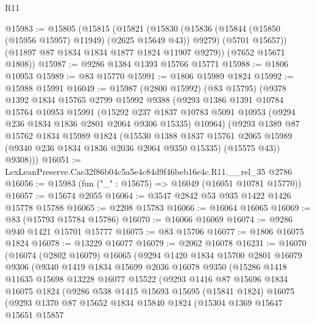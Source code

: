 \begin{lexlean}{R11}
\begin{coremodule}
@15983 := @15805
    (@15815
      (@15821
        (@15830
          (@15836 (@15844 (@15850 (@15956 @15957) @11949) (@2625 @15649 @43)) @9279)
          (@5701 @15657))
        (@11897 @87 @1834 @1834 @1877 @1824 @11907 @9279))
      (@7652 @15671 @1808))
@15987 := @9286 @1384 @1393 @15766 @15771
@15988 := @1806 @10953
@15989 := @83 @15770
@15991 := @1806 @15989 @1824
@15992 := @15988 @15991
@16049 := @15987
    (@2800 @15992)
    (@83 @15795)
    (@9378
      @1392
      @1834
      @15765
      @2799
      @15992
      @9388
      (@9293
        @1386
        @1391
        @10784
        @15764
        @10953
        @15991
        (@15292
          @237
          @1837
          @10783
          @5091
          @10953
          (@9294 @236 @1834 @1836 @2801 @2064 @9306 @15335)
          @10964)
        (@9293
          @1389
          @87
          @15762
          @1834
          @15989
          @1824
          (@15530
            @1388
            @1837
            @15761
            @2065
            @15989
            (@9340 @236 @1834 @1836 @2036 @2064 @9350 @15335)
            (@15575 @43))
          @9308)))
@16051 := LexLeanPreserve.Cac32f86b04c5a5e4c84d9f46beb16e4c.R11.__rel_35 @2786
@16056 := @15983 (fun ("_" : @15675) => @16049 (@16051 @10781 @15770))
@16057 := @15674 @2055
@16064 := @3547 @2842 @53 @935 @1422 @1426 @15778 @15788
@16065 := @2208 @15783
@16066 := @16064 @16065
@16069 := @83 (@15793 @15784 @15786)
@16070 := @16066 @16069
@16074 := @9286 @940 @1421 @15701 @15777
@16075 := @83 @15706
@16077 := @1806 @16075 @1824
@16078 := @13229 @16077
@16079 := @2062 @16078
@16231 := @16070
    (@16074
      (@2802 @16079)
      @16065
      (@9294
        @1420
        @1834
        @15700
        @2801
        @16079
        @9306
        (@9340
          @1419
          @1834
          @15699
          @2036
          @16078
          @9350
          (@15286
            @1418
            @11635
            @15698
            @13228
            @16077
            @15522
            (@9293
              @1416
              @87
              @15696
              @1834
              @16075
              @1824
              (@9286
                @538
                @1415
                @15693
                @15695
                (@15841 @1824)
                @16075
                (@9293
                  @1370
                  @87
                  @15652
                  @1834
                  @15840
                  @1824
                  (@15304
                    @1369
                    @15647
                    @15651
                    @15857

\end{coremodule}
\end{lexlean}
